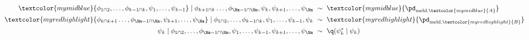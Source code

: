 \begin{align}
  \textcolor{mymidblue}{
    \phi_{1 \cap 2}, \ldots, \phi_{k - 1 \cap k},
    \psi_{1}, \ldots, \psi_{k - 1}
  }
    \mid
    \phi_{k + 1 \cap k} \ldots, \phi_{\Nm - 1 \cap \Nm},
    \psi_{k},
    \psi_{k + 1}, \ldots, \psi_{\Nm} 
  \,\, &\sim \,\, 
    \textcolor{mymidblue}{
      \pd_{\text{meld}, \textcolor{mymidblue}{A}}
    }
   \\
  \textcolor{myredhighlight}{
    \phi_{k \cap k + 1} \ldots, \phi_{\Nm - 1 \cap \Nm},
    \psi_{k + 1}, \ldots, \psi_{\Nm}
  }
    \mid
    \phi_{1 \cap 2}, \ldots, \phi_{k - 1 \cap k},
    \psi_{1}, \ldots, \psi_{k - 1},
    \psi_{k}
   \,\, &\sim \,\, 
    \textcolor{myredhighlight}{
      \pd_{\text{meld}, \textcolor{myredhighlight}{B}}
    }
   \\
  \psi_{k} 
  \mid 
  \phi_{1 \cap 2}, \ldots, \phi_{\Nm - 1 \cap \Nm},
  \psi_{1}, \ldots, \psi_{k-1}, \psi_{k + 1}, \ldots, \psi_{\Nm} 
  \,\, &\sim \,\, 
  \q(\psi_{k}^{*} \mid \psi_{k})
  \label{eqn:dc-gibbs-updates}
\end{align}